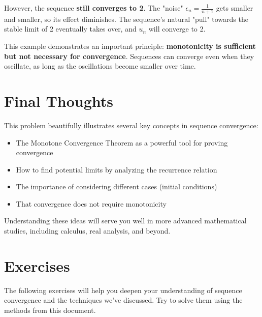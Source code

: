 \documentclass[12pt,a4paper]{article}
\theoremstyle{definition}
\begin{document}
However, the sequence \textbf{still converges to 2}. The "noise" $\epsilon_n = \frac{1}{n+1}$ gets smaller and smaller, so its effect diminishes. The sequence's natural "pull" towards the stable limit of 2 eventually takes over, and $u_n$ will converge to 2.

This example demonstrates an important principle: \textbf{monotonicity is sufficient but not necessary for convergence}. Sequences can converge even when they oscillate, as long as the oscillations become smaller over time.

\section{Final Thoughts}

This problem beautifully illustrates several key concepts in sequence convergence:
\begin{itemize}
    \item The Monotone Convergence Theorem as a powerful tool for proving convergence
    \item How to find potential limits by analyzing the recurrence relation
    \item The importance of considering different cases (initial conditions)
    \item That convergence does not require monotonicity
\end{itemize}

Understanding these ideas will serve you well in more advanced mathematical studies, including calculus, real analysis, and beyond.

\section{Exercises}

The following exercises will help you deepen your understanding of sequence convergence and the techniques we've discussed. Try to solve them using the methods from this document.
\end{document}
